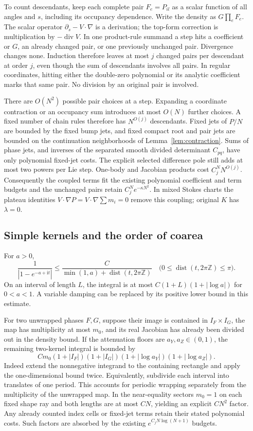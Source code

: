 \documentclass[11pt]{article}
\numberwithin{equation}{section}
\theoremstyle{definition}
\newcommand{\ii}{\mathrm i}
\newcommand{\Z}{\mathbb Z}
\begin{document}
To count descendants, keep each complete pair \(F_e=P_{il}\)
as a scalar function of all angles and \(s\), including its
occupancy dependence. Write the density as \(G\prod_e F_e\).
The scalar operator \(\partial_s-V\cdot\nabla\) is a derivation;
the top-form correction is multiplication by
\(-\operatorname{div}V\). In one product-rule summand a step
hits a coefficient or \(G\), an already changed pair, or one
previously unchanged pair. Divergence changes none. Induction
therefore leaves at most \(j\) changed pairs per descendant at
order \(j\), even though the sum of descendants involves all pairs.
In regular coordinates, hitting either the double-zero polynomial
or its analytic coefficient marks that same pair. No division
by an original pair is involved.

There are \(O(N^2)\) possible pair choices at a step. Expanding a
coordinate contraction or an occupancy sum introduces at most
\(O(N)\) further choices. A fixed number of chain rules therefore
has \(N^{O(j)}\) descendants. Fixed jets of \(P/N\) are bounded
by the fixed bump jets, and fixed compact root and pair jets are
bounded on the continuation neighborhoods of
Lemma~\ref{lem:contraction}. Sums of phase jets, and inverses of
the separated smooth divided determinant \(C_{pq}\), have only
polynomial fixed-jet costs. The explicit selected difference pole
still adds at most two powers per Lie step. One-body and Jacobian
products cost \(C_j^N N^{O(j)}\). Consequently the coupled terms
fit the existing polynomial coefficient and term budgets and
the unchanged pairs retain \(C_j^N e^{-\kappa N^2}\).
In mixed Stokes charts the plateau identities
\(V\cdot\nabla P=V\cdot\nabla\sum m_i=0\) remove this coupling;
original \(K\) has \(\lambda=0\).

\subsection{Simple kernels and the order of coarea}
For \(a>0\),
\[
 \frac1{|1-e^{-a+\ii t}|}
 \le\frac C{\min(1,a)+\operatorname{dist}(t,2\pi\Z)}
 \quad\bigl(0\le\operatorname{dist}(t,2\pi\Z)\le\pi\bigr).
\]
On an interval of length \(L\), the integral is at most
\(C(1+L)(1+|\log a|)\) for \(0<a<1\). A variable damping can be
replaced by its positive lower bound in this estimate.

For two unwrapped phases \(F,G\), suppose their image is contained
in \(I_F\times I_G\), the map has multiplicity at most \(m_0\),
and its real Jacobian has already been divided out in the density
bound. If the attenuation floors are \(a_Y,a_Z\in(0,1)\), the
remaining two-kernel integral is bounded by
\[
 C m_0(1+|I_F|)(1+|I_G|)
       (1+|\log a_Y|)(1+|\log a_Z|).
\]
Indeed extend the nonnegative integrand to the containing rectangle
and apply the one-dimensional bound twice. Equivalently, subdivide
each interval into translates of one period. This accounts for
periodic wrapping separately from the multiplicity of the unwrapped
map. In the near-equality sectors \(m_0=1\) on each fixed shape
ray and both lengths are at most \(CN\), yielding an explicit
\(CN^2\) factor. Any already counted index cells or fixed-jet
terms retain their stated polynomial costs. Such factors are
absorbed by the existing \(e^{C_jN\log(N+1)}\) budgets.
\end{document}
